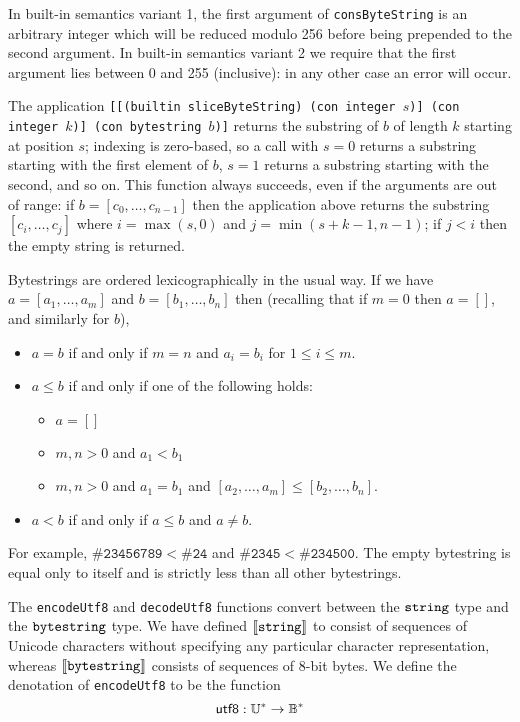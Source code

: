 \label{note:consbytestring}
In built-in semantics variant 1, the first argument of \texttt{consByteString}
is an arbitrary integer which will be reduced modulo 256 before being prepended
to the second argument.  In built-in semantics variant 2 we require that the first
argument lies between 0 and 255 (inclusive): in any other case an error will
occur.

\label{note:slicebytestring}
The application \texttt{[[(builtin sliceByteString) (con integer $s$)] (con
    integer $k$)] (con bytestring $b$)]} returns the substring of $b$ of length
$k$ starting at position $s$; indexing is zero-based, so a call with $s=0$
returns a substring starting with the first element of $b$, $s=1$ returns a
substring starting with the second, and so on.  This function always succeeds,
even if the arguments are out of range: if $b=[c_0, \ldots, c_{n-1}]$ then the
  application above returns the substring $[c_i, \ldots, c_j]$ where
  $i=\max(s,0)$ and $j=\min(s+k-1, n-1)$; if $j<i$ then the empty string is returned.

\label{note:bytestring-comparison}
Bytestrings are ordered lexicographically in the usual way. If we have $a =
  [a_1, \ldots, a_m]$ and $b = [b_1, \ldots, b_n]$ then (recalling that if $m=0$
  then $a=[]$, and similarly for $b$),
\begin{itemize}
\item $a = b$ if and only if $m=n$ and $a_i = b_i$ for $1 \leq i \leq m$.

\item $a \leq b$ if and only if one of the following holds:
\begin{itemize}
  \item $a = []$
  \item $m,n > 0$ and $a_1 < b_1$
  \item $m,n > 0$ and $a_1 = b_1$ and $[a_2,\ldots,a_m] \leq [b_2,\ldots,b_n]$.
\end{itemize}
\item $a < b$ if and only if $a \leq b$ and $a \neq b$.
\end{itemize}
\noindent For example, $\mathtt{\#23456789} < \mathtt{\#24}$ and
$\mathtt{\#2345} < \mathtt{\#234500}$.  The empty bytestring is equal only to
itself and is strictly less than all other bytestrings.

\label{note:bytestring-encoding}
The \texttt{encodeUtf8} and \texttt{decodeUtf8} functions convert between the
$\mathtt{string}$ type and the $\mathtt{bytestring}$ type.  We have defined
$\llbracket\mathit{\mathtt{string}}\rrbracket$ to consist of sequences of Unicode characters without
specifying any particular character representation, whereas
$\llbracket\mathit{\mathtt{bytestring}}\rrbracket$ consists of sequences of 8-bit bytes.  We define the
denotation of \texttt{encodeUtf8} to be the function
$$
\mathsf{utf8}: \mathbb{U}^* \rightarrow \mathbb{B}^*
$$


